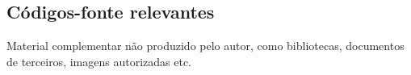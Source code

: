 \begin{anexosenv}
\chapter{Códigos-fonte relevantes}
Material complementar não produzido pelo autor, como bibliotecas, documentos de terceiros, imagens autorizadas etc.
\end{anexosenv}
